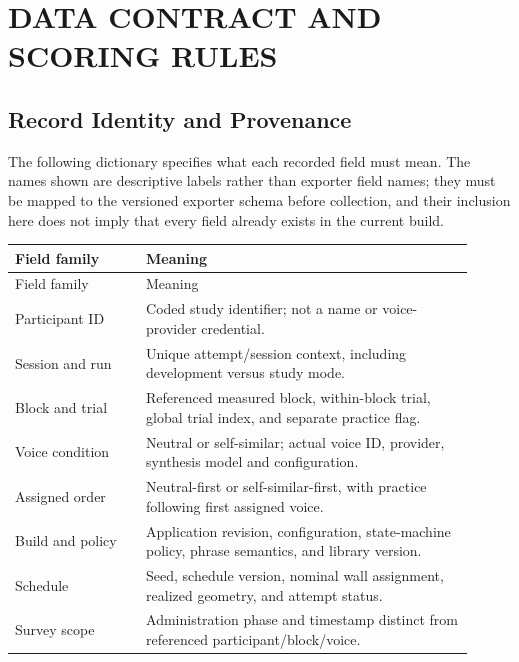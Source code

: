 \chapter{DATA CONTRACT AND SCORING RULES}
\label{app:data}
\newpage
\section{Record Identity and Provenance}
The following dictionary specifies what each recorded field must mean. The names shown are descriptive labels rather than exporter field names; they must be mapped to the versioned exporter schema before collection, and their inclusion here does not imply that every field already exists in the current build.

\begingroup
{}
\begin{longtable}{@{}p{0.26\linewidth}p{0.65\linewidth}@{}}
\toprule
Field family & Meaning \\\midrule\endfirsthead
\toprule Field family & Meaning \\\midrule\endhead
Participant ID & Coded study identifier; not a name or voice-provider credential.\\
Session and run & Unique attempt/session context, including development versus study mode.\\
Block and trial & Referenced measured block, within-block trial, global trial index, and separate practice flag.\\
Voice condition & Neutral or self-similar; actual voice ID, provider, synthesis model and configuration.\\
Assigned order & Neutral-first or self-similar-first, with practice following first assigned voice.\\
Build and policy & Application revision, configuration, state-machine policy, phrase semantics, and library version.\\
Schedule & Seed, schedule version, nominal wall assignment, realized geometry, and attempt status.\\
Survey scope & Administration phase and timestamp distinct from referenced participant/block/voice.\\\bottomrule
\end{longtable}
\endgroup

